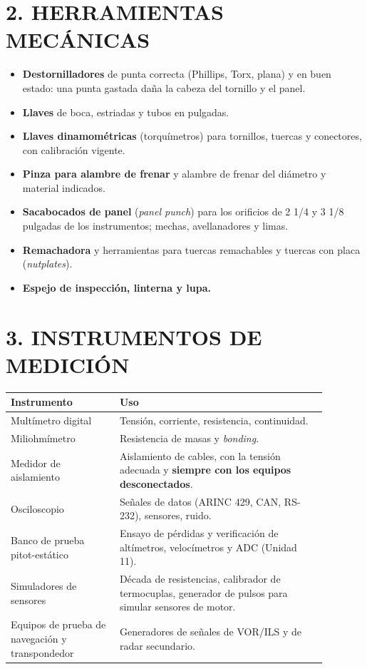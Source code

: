 \section*{2. HERRAMIENTAS MECÁNICAS}
\begin{itemize}
  \item \textbf{Destornilladores} de punta correcta (Phillips, Torx, plana) y en buen estado: una
        punta gastada daña la cabeza del tornillo y el panel.
  \item \textbf{Llaves} de boca, estriadas y tubos en pulgadas.
  \item \textbf{Llaves dinamométricas} (torquímetros) para tornillos, tuercas y conectores, con
        calibración vigente.
  \item \textbf{Pinza para alambre de frenar} y alambre de frenar del diámetro y material
        indicados.
  \item \textbf{Sacabocados de panel} (\textit{panel punch}) para los orificios de 2 1/4 y 3 1/8
        pulgadas de los instrumentos; mechas, avellanadores y limas.
  \item \textbf{Remachadora} y herramientas para tuercas remachables y tuercas con placa
        (\textit{nutplates}).
  \item \textbf{Espejo de inspección, linterna y lupa.}
\end{itemize}

\section*{3. INSTRUMENTOS DE MEDICIÓN}
\begin{center}
\small
\begin{tabular}{|p{0.30\linewidth}|p{0.58\linewidth}|}
\hline
\textbf{Instrumento} & \textbf{Uso} \\ \hline
Multímetro digital & Tensión, corriente, resistencia, continuidad. \\ \hline
Miliohmímetro & Resistencia de masas y \textit{bonding}. \\ \hline
Medidor de aislamiento & Aislamiento de cables, con la tensión adecuada y \textbf{siempre con los
equipos desconectados}. \\ \hline
Osciloscopio & Señales de datos (ARINC 429, CAN, RS-232), sensores, ruido. \\ \hline
Banco de prueba pitot-estático & Ensayo de pérdidas y verificación de altímetros, velocímetros y
ADC (Unidad 11). \\ \hline
Simuladores de sensores & Década de resistencias, calibrador de termocuplas, generador de pulsos
para simular sensores de motor. \\ \hline
Equipos de prueba de navegación y transpondedor & Generadores de señales de VOR/ILS y de radar
secundario. \\ \hline
\end{tabular}
\end{center}

